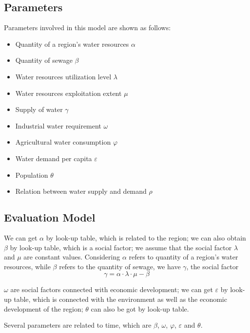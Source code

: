 \documentclass[tcn = 45538, sheet = true, abstract = true]{mcmthesis}
\begin{document}
\subsection{Parameters}

\hspace{1.5 em} Parameters involved in this model are shown as follows:

\begin{itemize}
\item Quantity of a region's water resources $\alpha$
\item Quantity of sewage $\beta$
\item Water resources utilization level $\lambda$
\item Water resources exploitation extent $\mu$
\item Supply of water $\gamma$
\item Industrial water requirement $\omega$
\item Agricultural water consumption $\varphi$
\item Water demand per capita $\varepsilon$
\item Population $\theta$
\item Relation between water supply and demand $\rho$
\end{itemize}

\subsection{Evaluation Model}

\qquad We can get $\alpha$ by look-up table, which is related to the region; 
we can also obtain $\beta$ by look-up table, which is a social factor;  
we assume that the social factor $\lambda$ and $\mu$ are constant values. 
Considering $\alpha$ refers to quantity of a region's water resources, 
while $\beta$ refers to the quantity of sewage, 
we have $\gamma$, the social factor 
\begin{equation}
\gamma = \alpha \cdot \lambda \cdot \mu - \beta
\label{eq:supply}
\end{equation}

$\omega$ are social factors connected with economic development; 
we can get $\varepsilon$ by look-up table, 
which is connected with the environment as well as the economic development of the region; 
$\theta$ can also be got by look-up table.

Several parameters are related to time, which are $\beta$, $\omega$, $\varphi$, $\varepsilon$ and $\theta$.
\end{document}
